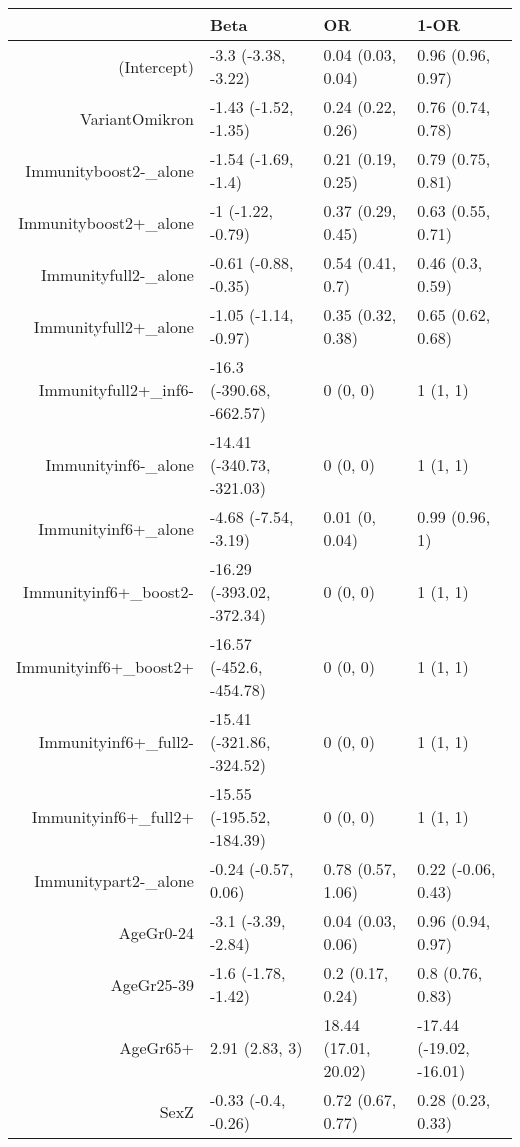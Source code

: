 \begin{table}[ht]
\centering
\begin{tabular}{rlll}
  \hline
 & Beta & OR & 1-OR \\ 
  \hline
(Intercept) & -3.3 (-3.38, -3.22) & 0.04 (0.03, 0.04) & 0.96 (0.96, 0.97) \\ 
  VariantOmikron & -1.43 (-1.52, -1.35) & 0.24 (0.22, 0.26) & 0.76 (0.74, 0.78) \\ 
  Immunityboost2-\_alone & -1.54 (-1.69, -1.4) & 0.21 (0.19, 0.25) & 0.79 (0.75, 0.81) \\ 
  Immunityboost2+\_alone & -1 (-1.22, -0.79) & 0.37 (0.29, 0.45) & 0.63 (0.55, 0.71) \\ 
  Immunityfull2-\_alone & -0.61 (-0.88, -0.35) & 0.54 (0.41, 0.7) & 0.46 (0.3, 0.59) \\ 
  Immunityfull2+\_alone & -1.05 (-1.14, -0.97) & 0.35 (0.32, 0.38) & 0.65 (0.62, 0.68) \\ 
  Immunityfull2+\_inf6- & -16.3 (-390.68, -662.57) & 0 (0, 0) & 1 (1, 1) \\ 
  Immunityinf6-\_alone & -14.41 (-340.73, -321.03) & 0 (0, 0) & 1 (1, 1) \\ 
  Immunityinf6+\_alone & -4.68 (-7.54, -3.19) & 0.01 (0, 0.04) & 0.99 (0.96, 1) \\ 
  Immunityinf6+\_boost2- & -16.29 (-393.02, -372.34) & 0 (0, 0) & 1 (1, 1) \\ 
  Immunityinf6+\_boost2+ & -16.57 (-452.6, -454.78) & 0 (0, 0) & 1 (1, 1) \\ 
  Immunityinf6+\_full2- & -15.41 (-321.86, -324.52) & 0 (0, 0) & 1 (1, 1) \\ 
  Immunityinf6+\_full2+ & -15.55 (-195.52, -184.39) & 0 (0, 0) & 1 (1, 1) \\ 
  Immunitypart2-\_alone & -0.24 (-0.57, 0.06) & 0.78 (0.57, 1.06) & 0.22 (-0.06, 0.43) \\ 
  AgeGr0-24 & -3.1 (-3.39, -2.84) & 0.04 (0.03, 0.06) & 0.96 (0.94, 0.97) \\ 
  AgeGr25-39 & -1.6 (-1.78, -1.42) & 0.2 (0.17, 0.24) & 0.8 (0.76, 0.83) \\ 
  AgeGr65+ & 2.91 (2.83, 3) & 18.44 (17.01, 20.02) & -17.44 (-19.02, -16.01) \\ 
  SexZ & -0.33 (-0.4, -0.26) & 0.72 (0.67, 0.77) & 0.28 (0.23, 0.33) \\ 
   \hline
\end{tabular}
\end{table}
